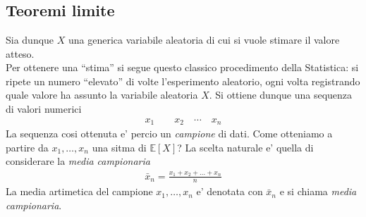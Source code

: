 \documentclass[a4paper,12pt]{article}
\begin{document}
\vspace{1px}\\
\\
\vspace{1px}\\
\subsection{Teoremi limite}
Sia dunque $X$ una generica variabile aleatoria di cui si vuole stimare il valore atteso.\\
Per ottenere una “stima” si segue questo classico procedimento della Statistica: si ripete
un numero “elevato” di volte l’esperimento aleatorio, ogni volta registrando quale valore
ha assunto la variabile aleatoria $X$. Si ottiene dunque una sequenza di valori numerici
\begin{align}
  x_1 \qquad x_2 \quad \cdots \quad x_n
\end{align}
La sequenza cosi ottenuta e' percio un \textit{campione} di dati. Come otteniamo a partire da $x_1, \ldots, x_n$ una sitma di $\mathbb{E}[X]$? La scelta naturale e' quella di considerare la \textit{media campionaria}
\begin{align}
  \bar{x}_n = \frac{x_1 + x_2 + \dots + x_n}{n}
\end{align}
La media artimetica del campione $x_1, \ldots, x_n$ e' denotata con $\bar{x}_n$ e si chiama \textit{media campionaria}.\\
\end{document}
